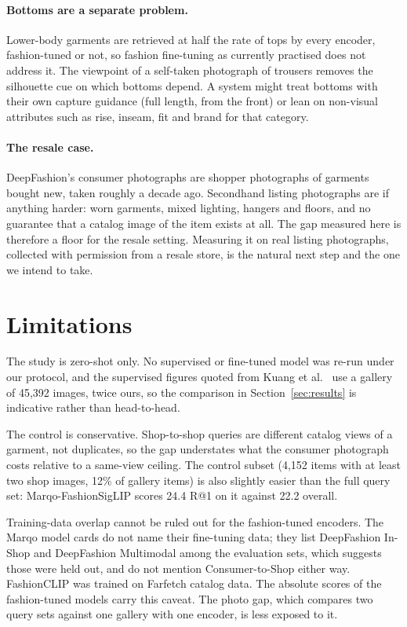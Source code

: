 \documentclass[10pt,twocolumn,letterpaper]{article}
\makeatletter
\newcommand{\recall}[1]{R@#1}
\makeatother
\begin{document}
\paragraph{Bottoms are a separate problem.}
Lower-body garments are retrieved at half the rate of tops by every encoder, fashion-tuned or not, so fashion fine-tuning as currently practised does not address it. The viewpoint of a self-taken photograph of trousers removes the silhouette cue on which bottoms depend. A system might treat bottoms with their own capture guidance (full length, from the front) or lean on non-visual attributes such as rise, inseam, fit and brand for that category.

\paragraph{The resale case.}
DeepFashion's consumer photographs are shopper photographs of garments bought new, taken roughly a decade ago. Secondhand listing photographs are if anything harder: worn garments, mixed lighting, hangers and floors, and no guarantee that a catalog image of the item exists at all. The gap measured here is therefore a floor for the resale setting. Measuring it on real listing photographs, collected with permission from a resale store, is the natural next step and the one we intend to take.

\section{Limitations}

The study is zero-shot only. No supervised or fine-tuned model was re-run under our protocol, and the supervised figures quoted from Kuang et al.~\cite{kuang2019grnet} use a gallery of 45,392 images, twice ours, so the comparison in Section~\ref{sec:results} is indicative rather than head-to-head.

The control is conservative. Shop-to-shop queries are different catalog views of a garment, not duplicates, so the gap understates what the consumer photograph costs relative to a same-view ceiling. The control subset (4,152 items with at least two shop images, 12\% of gallery items) is also slightly easier than the full query set: Marqo-FashionSigLIP scores 24.4 \recall{1} on it against 22.2 overall.

Training-data overlap cannot be ruled out for the fashion-tuned encoders. The Marqo model cards do not name their fine-tuning data; they list DeepFashion In-Shop and DeepFashion Multimodal among the evaluation sets, which suggests those were held out, and do not mention Consumer-to-Shop either way. FashionCLIP was trained on Farfetch catalog data. The absolute scores of the fashion-tuned models carry this caveat. The photo gap, which compares two query sets against one gallery with one encoder, is less exposed to it.
\end{document}
